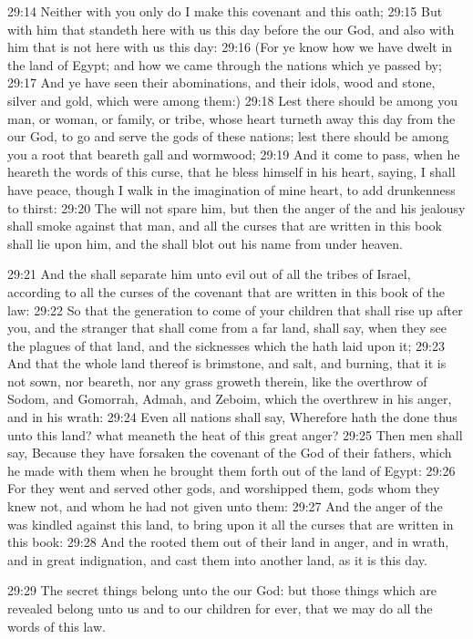 29:14 Neither with you only do I make this covenant and this oath; 29:15 But with him that standeth here with us this day before the \LORD our God, and also with him that is not here with us this day: 29:16 (For ye know how we have dwelt in the land of Egypt; and how we came through the nations which ye passed by; 29:17 And ye have seen their abominations, and their idols, wood and stone, silver and gold, which were among them:) 29:18 Lest there should be among you man, or woman, or family, or tribe, whose heart turneth away this day from the \LORD our God, to go and serve the gods of these nations; lest there should be among you a root that beareth gall and wormwood; 29:19 And it come to pass, when he heareth the words of this curse, that he bless himself in his heart, saying, I shall have peace, though I walk in the imagination of mine heart, to add drunkenness to thirst: 29:20 The \LORD will not spare him, but then the anger of the \LORD and his jealousy shall smoke against that man, and all the curses that are written in this book shall lie upon him, and the \LORD shall blot out his name from under heaven.

29:21 And the \LORD shall separate him unto evil out of all the tribes of Israel, according to all the curses of the covenant that are written in this book of the law: 29:22 So that the generation to come of your children that shall rise up after you, and the stranger that shall come from a far land, shall say, when they see the plagues of that land, and the sicknesses which the \LORD hath laid upon it; 29:23 And that the whole land thereof is brimstone, and salt, and burning, that it is not sown, nor beareth, nor any grass groweth therein, like the overthrow of Sodom, and Gomorrah, Admah, and Zeboim, which the \LORD overthrew in his anger, and in his wrath: 29:24 Even all nations shall say, Wherefore hath the \LORD done thus unto this land? what meaneth the heat of this great anger?  29:25 Then men shall say, Because they have forsaken the covenant of the \LORD God of their fathers, which he made with them when he brought them forth out of the land of Egypt: 29:26 For they went and served other gods, and worshipped them, gods whom they knew not, and whom he had not given unto them: 29:27 And the anger of the \LORD was kindled against this land, to bring upon it all the curses that are written in this book: 29:28 And the \LORD rooted them out of their land in anger, and in wrath, and in great indignation, and cast them into another land, as it is this day.

29:29 The secret things belong unto the \LORD our God: but those things which are revealed belong unto us and to our children for ever, that we may do all the words of this law.

